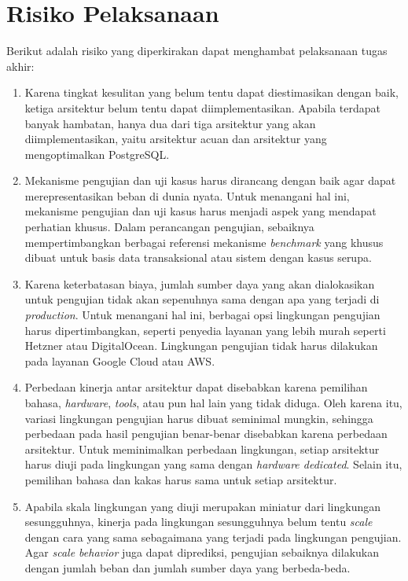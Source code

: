 \section{Risiko Pelaksanaan}

Berikut adalah risiko yang diperkirakan dapat menghambat pelaksanaan tugas akhir:

\begin{enumerate}
    \item Karena tingkat kesulitan yang belum tentu dapat diestimasikan dengan baik, ketiga arsitektur belum tentu dapat diimplementasikan. Apabila terdapat banyak hambatan, hanya dua dari tiga arsitektur yang akan diimplementasikan, yaitu arsitektur acuan dan arsitektur yang mengoptimalkan PostgreSQL.
    \item Mekanisme pengujian dan uji kasus harus dirancang dengan baik agar dapat merepresentasikan beban di dunia nyata. Untuk menangani hal ini, mekanisme pengujian dan uji kasus harus menjadi aspek yang mendapat perhatian khusus. Dalam perancangan pengujian, sebaiknya mempertimbangkan berbagai referensi mekanisme \textit{benchmark} yang khusus dibuat untuk basis data transaksional atau sistem dengan kasus serupa.
    \item Karena keterbatasan biaya, jumlah sumber daya yang akan dialokasikan untuk pengujian tidak akan sepenuhnya sama dengan apa yang terjadi di \textit{production}. Untuk menangani hal ini, berbagai opsi lingkungan pengujian harus dipertimbangkan, seperti penyedia layanan yang lebih murah seperti Hetzner atau DigitalOcean. Lingkungan pengujian tidak harus dilakukan pada layanan Google Cloud atau AWS.
    \item Perbedaan kinerja antar arsitektur dapat disebabkan karena pemilihan bahasa, \textit{hardware}, \textit{tools}, atau pun hal lain yang tidak diduga. Oleh karena itu, variasi lingkungan pengujian harus dibuat seminimal mungkin, sehingga perbedaan pada hasil pengujian benar-benar disebabkan karena perbedaan arsitektur. Untuk meminimalkan perbedaan lingkungan, setiap arsitektur harus diuji pada lingkungan yang sama dengan \textit{hardware dedicated}. Selain itu, pemilihan bahasa dan kakas harus sama untuk setiap arsitektur.
    \item Apabila skala lingkungan yang diuji merupakan miniatur dari lingkungan sesungguhnya, kinerja pada lingkungan sesungguhnya belum tentu \textit{scale} dengan cara yang sama sebagaimana yang terjadi pada lingkungan pengujian. Agar \textit{scale behavior} juga dapat diprediksi, pengujian sebaiknya dilakukan dengan jumlah beban dan jumlah sumber daya yang berbeda-beda.
\end{enumerate}